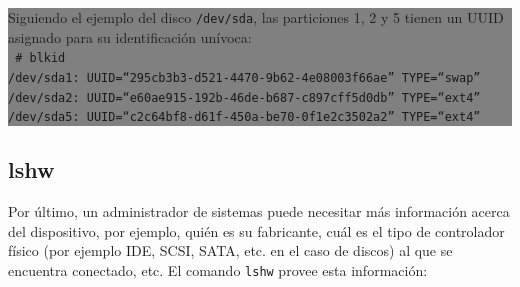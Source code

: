 \documentclass[12pt]{article}
\begin{document}
\colorbox{grey}{\parbox[t]{0.95\linewidth}{ \vspace*{0.5cm} { 
Siguiendo el ejemplo del disco \texttt{/dev/sda}, las particiones 1, 2
y 5 tienen un UUID asignado para su identificación unívoca: \\ 
{\tt
\# blkid\\
/dev/sda1: UUID=``295cb3b3-d521-4470-9b62-4e08003f66ae'' TYPE=``swap''\\
/dev/sda2: UUID=``e60ae915-192b-46de-b687-c897cff5d0db'' TYPE=``ext4''\\
/dev/sda5: UUID=``c2c64bf8-d61f-450a-be70-0f1e2c3502a2'' TYPE=``ext4''\\ 
}
} \vspace*{0.5cm} } } 

\subsection*{lshw}

Por último, un administrador de sistemas puede necesitar más información acerca 
del dispositivo, por ejemplo, quién es su fabricante, cuál es el tipo de
controlador físico (por ejemplo IDE, SCSI, SATA, etc. en el caso de discos) 
al que se encuentra conectado, etc. 
El comando \texttt{lshw} provee esta información: 
\end{document}
